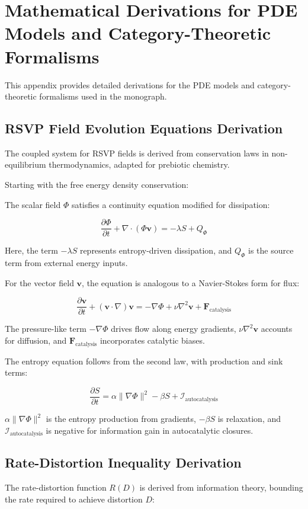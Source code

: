 \documentclass{book}
\begin{document}
\appendix

\chapter{Mathematical Derivations for PDE Models and Category-Theoretic Formalisms}
This appendix provides detailed derivations for the PDE models and category-theoretic formalisms used in the monograph.

\section{RSVP Field Evolution Equations Derivation}
The coupled system for RSVP fields is derived from conservation laws in non-equilibrium thermodynamics, adapted for prebiotic chemistry.

Starting with the free energy density conservation:

The scalar field $\Phi$ satisfies a continuity equation modified for dissipation:

\[\frac{\partial \Phi}{\partial t} + \nabla \cdot (\Phi \mathbf{v}) = - \lambda S + Q_\Phi\]

Here, the term $- \lambda S$ represents entropy-driven dissipation, and $Q_\Phi$ is the source term from external energy inputs.

For the vector field $\mathbf{v}$, the equation is analogous to a Navier-Stokes form for flux:

\[\frac{\partial \mathbf{v}}{\partial t} + (\mathbf{v} \cdot \nabla) \mathbf{v} = - \nabla \Phi + \nu \nabla^2 \mathbf{v} + \mathbf{F}_{\text{catalysis}}\]

The pressure-like term $-\nabla \Phi$ drives flow along energy gradients, $\nu \nabla^2 \mathbf{v}$ accounts for diffusion, and $\mathbf{F}_{\text{catalysis}}$ incorporates catalytic biases.

The entropy equation follows from the second law, with production and sink terms:

\[\frac{\partial S}{\partial t} = \alpha \|\nabla \Phi\|^2 - \beta S + \mathcal{I}_{\text{autocatalysis}}\]

$\alpha \|\nabla \Phi\|^2$ is the entropy production from gradients, $-\beta S$ is relaxation, and $\mathcal{I}_{\text{autocatalysis}}$ is negative for information gain in autocatalytic closures.

\section{Rate-Distortion Inequality Derivation}
The rate-distortion function $R(D)$ is derived from information theory, bounding the rate required to achieve distortion $D$:
\end{document}
